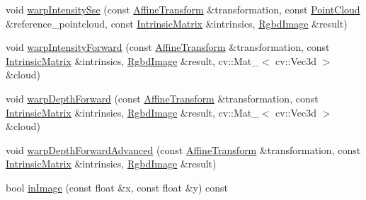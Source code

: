 \begin{DoxyCompactItemize}
\item 
void \mbox{\hyperlink{structdvo_1_1core_1_1_rgbd_image_af35a385488bc48bf81ebb5cb96f58449}{warp\+Intensity\+Sse}} (const \mbox{\hyperlink{namespacedvo_1_1core_af89a8f837f3ae51ed196b7988e59e53d}{Affine\+Transform}} \&transformation, const \mbox{\hyperlink{structdvo_1_1core_1_1_rgbd_image_a56820965eb98427d06e6733fe333cdc5}{Point\+Cloud}} \&reference\+\_\+pointcloud, const \mbox{\hyperlink{structdvo_1_1core_1_1_intrinsic_matrix}{Intrinsic\+Matrix}} \&intrinsics, \mbox{\hyperlink{structdvo_1_1core_1_1_rgbd_image}{Rgbd\+Image}} \&result)
\item 
void \mbox{\hyperlink{structdvo_1_1core_1_1_rgbd_image_a3da7245dc71cced4c4ea2d3e877a45b2}{warp\+Intensity\+Forward}} (const \mbox{\hyperlink{namespacedvo_1_1core_af89a8f837f3ae51ed196b7988e59e53d}{Affine\+Transform}} \&transformation, const \mbox{\hyperlink{structdvo_1_1core_1_1_intrinsic_matrix}{Intrinsic\+Matrix}} \&intrinsics, \mbox{\hyperlink{structdvo_1_1core_1_1_rgbd_image}{Rgbd\+Image}} \&result, cv\+::\+Mat\+\_\+$<$ cv\+::\+Vec3d $>$ \&cloud)
\item 
void \mbox{\hyperlink{structdvo_1_1core_1_1_rgbd_image_a371d5f3f46499961ab301f507f67daf7}{warp\+Depth\+Forward}} (const \mbox{\hyperlink{namespacedvo_1_1core_af89a8f837f3ae51ed196b7988e59e53d}{Affine\+Transform}} \&transformation, const \mbox{\hyperlink{structdvo_1_1core_1_1_intrinsic_matrix}{Intrinsic\+Matrix}} \&intrinsics, \mbox{\hyperlink{structdvo_1_1core_1_1_rgbd_image}{Rgbd\+Image}} \&result, cv\+::\+Mat\+\_\+$<$ cv\+::\+Vec3d $>$ \&cloud)
\item 
void \mbox{\hyperlink{structdvo_1_1core_1_1_rgbd_image_acc3ee946610da287f2c5680bdc41cf07}{warp\+Depth\+Forward\+Advanced}} (const \mbox{\hyperlink{namespacedvo_1_1core_af89a8f837f3ae51ed196b7988e59e53d}{Affine\+Transform}} \&transformation, const \mbox{\hyperlink{structdvo_1_1core_1_1_intrinsic_matrix}{Intrinsic\+Matrix}} \&intrinsics, \mbox{\hyperlink{structdvo_1_1core_1_1_rgbd_image}{Rgbd\+Image}} \&result)
\item 
bool \mbox{\hyperlink{structdvo_1_1core_1_1_rgbd_image_ac6c56350e20356eac913fe2b0e7ea995}{in\+Image}} (const float \&x, const float \&y) const
\end{DoxyCompactItemize}
